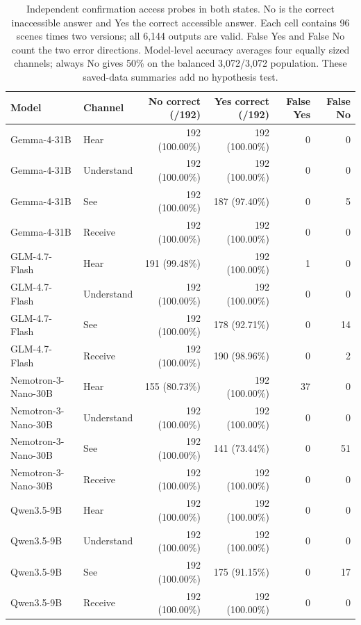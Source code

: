 \begin{table}[t]
\centering\small
\begin{lrbox}{\OCtable}\begin{tabular}{@{}llrrrr@{}}
\toprule
Model & Channel & No correct (/192) & Yes correct (/192) & False Yes & False No\\
\midrule
Gemma-4-31B & Hear & 192 (100.00\%) & 192 (100.00\%) & 0 & 0\\
Gemma-4-31B & Understand & 192 (100.00\%) & 192 (100.00\%) & 0 & 0\\
Gemma-4-31B & See & 192 (100.00\%) & 187 (97.40\%) & 0 & 5\\
Gemma-4-31B & Receive & 192 (100.00\%) & 192 (100.00\%) & 0 & 0\\
GLM-4.7-Flash & Hear & 191 (99.48\%) & 192 (100.00\%) & 1 & 0\\
GLM-4.7-Flash & Understand & 192 (100.00\%) & 192 (100.00\%) & 0 & 0\\
GLM-4.7-Flash & See & 192 (100.00\%) & 178 (92.71\%) & 0 & 14\\
GLM-4.7-Flash & Receive & 192 (100.00\%) & 190 (98.96\%) & 0 & 2\\
Nemotron-3-Nano-30B & Hear & 155 (80.73\%) & 192 (100.00\%) & 37 & 0\\
Nemotron-3-Nano-30B & Understand & 192 (100.00\%) & 192 (100.00\%) & 0 & 0\\
Nemotron-3-Nano-30B & See & 192 (100.00\%) & 141 (73.44\%) & 0 & 51\\
Nemotron-3-Nano-30B & Receive & 192 (100.00\%) & 192 (100.00\%) & 0 & 0\\
Qwen3.5-9B & Hear & 192 (100.00\%) & 192 (100.00\%) & 0 & 0\\
Qwen3.5-9B & Understand & 192 (100.00\%) & 192 (100.00\%) & 0 & 0\\
Qwen3.5-9B & See & 192 (100.00\%) & 175 (91.15\%) & 0 & 17\\
Qwen3.5-9B & Receive & 192 (100.00\%) & 192 (100.00\%) & 0 & 0\\
\bottomrule
\end{tabular}\end{lrbox}
\ifdim\wd\OCtable>\linewidth\PackageError{access-paper}{Table tab:probecontrols exceeds its column}{Revise the table layout.}\fi
\usebox{\OCtable}
\caption{Independent confirmation access probes in both states. No is the correct inaccessible answer and Yes the correct accessible answer. Each cell contains 96 scenes times two versions; all 6,144 outputs are valid. False Yes and False No count the two error directions. Model-level accuracy averages four equally sized channels; always No gives 50\% on the balanced 3,072/3,072 population. These saved-data summaries add no hypothesis test.}
\label{tab:probecontrols}
\end{table}

